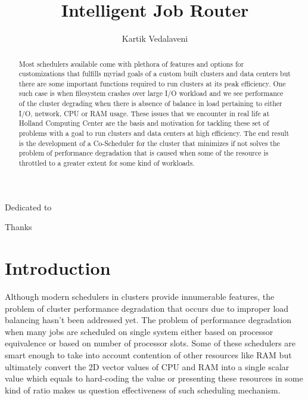 \documentclass[ms,electronic,double]{nuthesis}
\begin{document}
  
\frontmatter
\title{Intelligent Job Router}
\author{Kartik Vedalaveni}

\maketitle

\begin{abstract}

Most schedulers available come with plethora of features and 
options for customizations that fulfills myriad goals of a custom built 
clusters and data centers but there are some important functions required to
run clusters at its peak efficiency. One such case is when filesystem crashes over large I/O 
workload and we see performance of the cluster degrading when there is absence of balance in load
pertaining to either I/O, network, CPU or RAM usage.
These issues that we encounter in real life at Holland Computing Center are the 
basis and motivation for tackling these set of problems with a goal to run clusters and data centers
at high efficiency. The end result is the development of a Co-Scheduler for the
cluster that minimizes if not solves the problem of performance degradation that is caused when some of the resource 
is throttled to a greater extent for some kind of workloads.

\end{abstract}

\begin{dedication}
Dedicated to 
\end{dedication}

\begin{acknowledgments}
Thanks
\end{acknowledgments}

\tableofcontents


\mainmatter

\chapter{Introduction}
Although modern schedulers in clusters provide innumerable features, the problem of cluster 
performance degradation that occurs due to improper load balancing hasn't been addressed yet. The problem of 
performance degradation when many jobs are scheduled on single system either 
based on processor equivalence or based on number of processor slots. Some of 
these schedulers are smart enough to take into account contention of other 
resources like RAM but ultimately convert the 2D vector values of CPU and RAM 
into a single scalar value which equals to hard-coding the value or presenting these resources
in some kind of ratio makes us question effectiveness of such scheduling mechanism.
\end{document}

